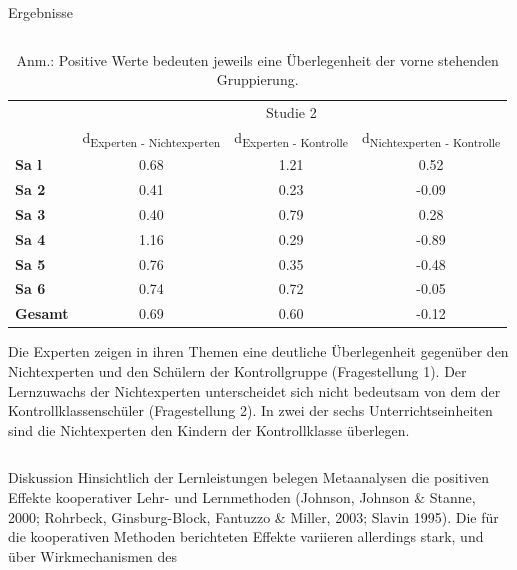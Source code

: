 \documentclass[final]{beamer}
\newlength{\onecolwid}
\newlength{\twocolwid}
\begin{document}
\begin{frame}[t]
\begin{columns}[t]
\begin{column}{\twocolwid}
\begin{block}{Ergebnisse}
\begin{columns}[t,totalwidth=\twocolwid]
\begin{column}{\onecolwid} %
\begin{table}
\begin{tabular}{lccc}
 & \multicolumn{3}{c}{Studie 2} \\
\cmidrule{2-4}
 & d\textsubscript{Experten - Nichtexperten} & d\textsubscript{Experten - Kontrolle} & d\textsubscript{Nichtexperten - Kontrolle} \\
\midrule 
\textbf{Sa l} & 0.68 & 1.21 & 0.52 \\
\textbf{Sa 2} & 0.41 & 0.23 & -0.09 \\
\textbf{Sa 3} & 0.40 & 0.79 & 0.28 \\
\textbf{Sa 4} & 1.16 & 0.29 & -0.89 \\
\textbf{Sa 5} & 0.76 & 0.35 & -0.48 \\
\textbf{Sa 6} & 0.74 & 0.72 & -0.05 \\
\midrule 
\textbf{Gesamt} & 0.69 & 0.60 & -0.12 \\
\bottomrule
\end{tabular}
{\caption*{Anm.: Positive Werte bedeuten jeweils eine Überlegenheit der vorne stehenden Gruppierung.}}
\end{table}

\justifying
Die Experten zeigen in ihren Themen eine deutliche Überlegenheit gegenüber den Nichtexperten und den Schülern der Kontrollgruppe (Fragestellung 1). 
Der Lernzuwachs der Nichtexperten unterscheidet sich nicht bedeutsam von dem der Kontrollklassenschüler (Fragestellung 2).
In zwei der sechs Unterrichtseinheiten sind die Nichtexperten den Kindern der Kontrollklasse überlegen. 

\end{column} %
\end{columns} %
\end{block}

\begin{block}{Diskussion}
Hinsichtlich der Lernleistungen  belegen Metaanalysen die positiven Effekte kooperativer Lehr- und Lernmethoden (Johnson, Johnson \& Stanne, 2000; Rohrbeck, Ginsburg-Block, Fantuzzo \& Miller, 2003; Slavin 1995). Die für die kooperativen Methoden berichteten Effekte variieren allerdings stark, und über Wirkmechanismen des 
\end{block}

\end{column} %
\end{columns} %
\end{frame} %
\end{document}
